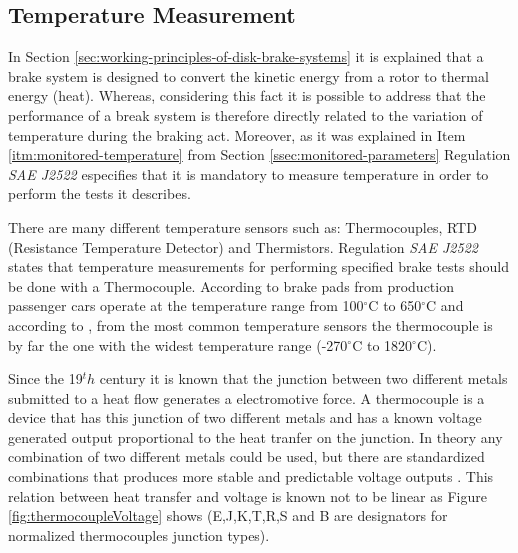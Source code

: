 \subsection{Temperature Measurement} \label{ssec:thermocouple}
	In Section \ref{sec:working-principles-of-disk-brake-systems} it is explained that a brake system is designed to convert the kinetic energy from a rotor to thermal energy (heat). Whereas, considering this fact it is possible to address that the performance of a break system is therefore directly related to the variation of temperature during the braking act. Moreover, as it was explained in Item \ref{itm:monitored-temperature} from Section \ref{ssec:monitored-parameters} Regulation \textit{SAE J2522} \cite{saej2522} especifies that it is mandatory to measure temperature in order to perform the tests it describes.
	\par
	There are many different temperature sensors such as: Thermocouples, RTD (Resistance Temperature Detector) and Thermistors. Regulation \textit{SAE J2522} \cite{saej2522} states that temperature measurements for performing specified brake tests should be done with a Thermocouple. According to \cite{newton2016braketemperatures} brake pads from production passenger cars operate at the temperature range from 100$^{\circ}$C to 650$^{\circ}$C and according to \cite{gums2018}, from the most common temperature sensors the thermocouple is by far the one with the widest temperature range (-270$^{\circ}$C to 1820$^{\circ}$C).
	\par
	Since the 19$^th$ century it is known that the junction between two different metals submitted to a heat flow generates a electromotive force. A thermocouple is a device that has this junction of two different metals and has a known voltage generated output proportional to the heat tranfer on the junction. In theory any combination of two different metals could be used, but there are standardized combinations that produces more stable and predictable voltage outputs \cite{pollock1991thermocouples}. This relation between heat transfer and voltage is known not to be linear as Figure \ref{fig:thermocoupleVoltage} shows (E,J,K,T,R,S and B are designators for normalized thermocouples junction types).

